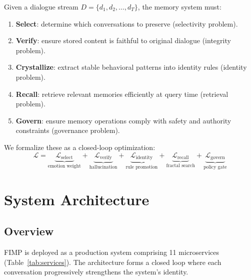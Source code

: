 \documentclass[11pt,a4paper]{article}
\begin{document}
Given a dialogue stream $D = \{d_1, d_2, \dots, d_T\}$, the memory system must:

\begin{enumerate}[leftmargin=*, itemsep=2pt]
  \item \textbf{Select}: determine which conversations to preserve (selectivity problem).
  \item \textbf{Verify}: ensure stored content is faithful to original dialogue (integrity
        problem).
  \item \textbf{Crystallize}: extract stable behavioral patterns into identity rules
        (identity problem).
  \item \textbf{Recall}: retrieve relevant memories efficiently at query time (retrieval
        problem).
  \item \textbf{Govern}: ensure memory operations comply with safety and authority
        constraints (governance problem).
\end{enumerate}

We formalize these as a closed-loop optimization:
\[
  \mathcal{L} = \underbrace{\mathcal{L}_{\text{select}}}_{\text{emotion weight}}
  + \underbrace{\mathcal{L}_{\text{verify}}}_{\text{hallucination}}
  + \underbrace{\mathcal{L}_{\text{identity}}}_{\text{rule promotion}}
  + \underbrace{\mathcal{L}_{\text{recall}}}_{\text{fractal search}}
  + \underbrace{\mathcal{L}_{\text{govern}}}_{\text{policy gate}}
\]

\section{System Architecture}

\subsection{Overview}

FIMP is deployed as a production system comprising 11 microservices
(Table~\ref{tab:services}). The architecture forms a closed loop where each conversation
progressively strengthens the system's identity.
\end{document}
